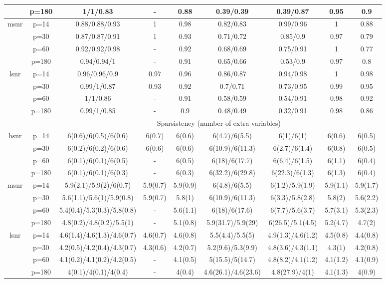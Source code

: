 \begin{table}[ht]
{\begin{tabular}{|c|c|ccccccc|}
   & p=180 & 1/1/0.83 & - & 0.88 & 0.39/0.39 & 0.39/0.87 & 0.95 & 0.9 \\ 
  \midrule\multirow{4}[2]{*}{msnr} & p=14 & 0.88/0.88/0.93 & 1 & 0.98 & 0.82/0.83 & 0.99/0.96 & 1 & 0.88 \\ 
   & p=30 & 0.87/0.87/0.91 & 1 & 0.93 & 0.71/0.72 & 0.85/0.9 & 0.97 & 0.79 \\ 
   & p=60 & 0.92/0.92/0.98 & - & 0.92 & 0.68/0.69 & 0.75/0.91 & 1 & 0.77 \\ 
   & p=180 & 0.94/0.94/1 & - & 0.91 & 0.65/0.66 & 0.53/0.9 & 0.97 & 0.8 \\ 
  \midrule\multirow{4}[2]{*}{lsnr} & p=14 & 0.96/0.96/0.9 & 0.97 & 0.96 & 0.86/0.87 & 0.94/0.98 & 1 & 0.98 \\ 
   & p=30 & 0.99/1/0.87 & 0.93 & 0.92 & 0.7/0.71 & 0.73/0.95 & 0.99 & 0.95 \\ 
   & p=60 & 1/1/0.86 & - & 0.91 & 0.58/0.59 & 0.54/0.91 & 0.98 & 0.92 \\ 
   & p=180 & 0.99/1/0.85 & - & 0.9 & 0.48/0.49 & 0.32/0.91 & 0.98 & 0.86 \\ 
   \midrule 
 \multicolumn{1}{|c}{} &       & \multicolumn{7}{c|}{Sparsistency (number of extra variables)} \\
\midrule\multirow{4}[2]{*}{hsnr} & p=14 & 6(0.6)/6(0.5)/6(0.6) & 6(0.7) & 6(0.6) & 6(4.7)/6(5.5) & 6(1)/6(1) & 6(0.6) & 6(0.5) \\ 
   & p=30 & 6(0.2)/6(0.2)/6(0.6) & 6(0.6) & 6(0.6) & 6(10.9)/6(11.3) & 6(2.7)/6(1.4) & 6(0.8) & 6(0.5) \\ 
   & p=60 & 6(0.1)/6(0.1)/6(0.5) & - & 6(0.5) & 6(18)/6(17.7) & 6(6.4)/6(1.5) & 6(1.1) & 6(0.4) \\ 
   & p=180 & 6(0.1)/6(0.1)/6(0.3) & - & 6(0.3) & 6(32.2)/6(29.8) & 6(22.3)/6(1.3) & 6(1.3) & 6(0.4) \\ 
  \midrule\multirow{4}[2]{*}{msnr} & p=14 & 5.9(2.1)/5.9(2)/6(0.7) & 5.9(0.7) & 5.9(0.9) & 6(4.8)/6(5.5) & 6(1.2)/5.9(1.9) & 5.9(1.1) & 5.9(1.7) \\ 
   & p=30 & 5.6(1.1)/5.6(1)/5.9(0.8) & 5.9(0.7) & 5.8(1) & 6(10.9)/6(11.3) & 6(3.3)/5.8(2.8) & 5.8(2) & 5.6(2.2) \\ 
   & p=60 & 5.4(0.4)/5.3(0.3)/5.8(0.8) & - & 5.6(1.1) & 6(18)/6(17.6) & 6(7.7)/5.6(3.7) & 5.7(3.1) & 5.3(2.3) \\ 
   & p=180 & 4.8(0.2)/4.8(0.2)/5.5(1) & - & 5.1(0.8) & 5.9(31.7)/5.9(29) & 6(26.5)/5.1(4.5) & 5.2(4.7) & 4.7(2) \\ 
  \midrule\multirow{4}[2]{*}{lsnr} & p=14 & 4.6(1.4)/4.6(1.3)/4.6(0.7) & 4.6(0.7) & 4.6(0.8) & 5.5(4.4)/5.5(5) & 4.9(1.3)/4.6(1.2) & 4.5(0.8) & 4.4(0.8) \\ 
   & p=30 & 4.2(0.5)/4.2(0.4)/4.3(0.7) & 4.3(0.6) & 4.2(0.7) & 5.2(9.6)/5.3(9.9) & 4.8(3.6)/4.3(1.1) & 4.3(1) & 4.2(0.8) \\ 
   & p=60 & 4.1(0.2)/4.1(0.2)/4.2(0.5) & - & 4.1(0.5) & 5(15.5)/5(14.7) & 4.8(8.2)/4.1(1.2) & 4.1(1.2) & 4.1(0.9) \\ 
   & p=180 & 4(0.1)/4(0.1)/4(0.4) & - & 4(0.4) & 4.6(26.1)/4.6(23.6) & 4.8(27.9)/4(1) & 4.1(1.3) & 4(0.9) \\ 
   \bottomrule 
\end{tabular}
}
\end{table}
